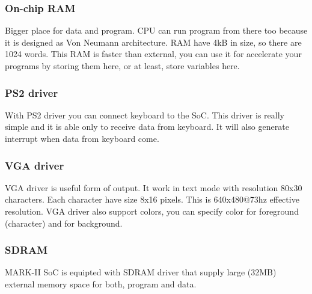 \subsubsection{On-chip RAM}

Bigger place for data and program. CPU can run program from there too because
it is designed as Von Neumann architecture. RAM have 4kB in size, so there are
1024 words. This RAM is faster than external, you can use it for accelerate your
programs by storing them here, or at least, store variables here.

\subsubsection{PS2 driver}

With PS2 driver you can connect keyboard to the SoC. This driver is really
simple and it is able only to receive data from keyboard. It will also generate
interrupt when data from keyboard come.

\subsubsection{VGA driver}

VGA driver is useful form of output. It work in text mode with resolution 80x30
characters. Each character have size 8x16 pixels. This is 640x480@73hz effective
resolution. VGA driver also support colors, you can specify color for foreground
(character) and for background.

\subsubsection{SDRAM}

MARK-II SoC is equipted with SDRAM driver that supply large (32MB) 
external memory space for both, program and data.

